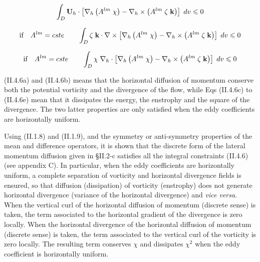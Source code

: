 \documentclass[../tex_main/NEMO_manual]{subfiles}
\begin{document}
\begin{equation} \label{eq:dynldf_curl}
\int_D {{\rm {\bf U}}_h \cdot \left[ {\nabla _h \left( {A^{lm}\;\chi } 
\right)-\nabla _h \times \left( {A^{lm}\;\zeta \;{\rm {\bf k}}} \right)} 
\right]\;dv} \leqslant 0
\end{equation}

\begin{equation} \label{eq:dynldf_curl2}
\mbox{if}\quad A^{lm}=cste\quad \quad \int_D {\zeta \;{\rm {\bf k}}\cdot 
\nabla \times \left[ {\nabla _h \left( {A^{lm}\;\chi } \right)-\nabla _h 
\times \left( {A^{lm}\;\zeta \;{\rm {\bf k}}} \right)} \right]\;dv} 
\leqslant 0
\end{equation}

\begin{equation} \label{eq:dynldf_div2}
\mbox{if}\quad A^{lm}=cste\quad \quad \int_D {\chi \;\nabla _h \cdot \left[ 
{\nabla _h \left( {A^{lm}\;\chi } \right)-\nabla _h \times \left( 
{A^{lm}\;\zeta \;{\rm {\bf k}}} \right)} \right]\;dv} \leqslant 0
\end{equation}


(II.4.6a) and (II.4.6b) means that the horizontal diffusion of momentum conserve both the potential vorticity and
the divergence of the flow, while Eqs (II.4.6c) to (II.4.6e) mean that it dissipates the energy, the enstrophy and
the square of the divergence.
The two latter properties are only satisfied when the eddy coefficients are horizontally uniform.

Using (II.1.8) and (II.1.9), and the symmetry or anti-symmetry properties of the mean and difference operators,
it is shown that the discrete form of the lateral momentum diffusion given in
{\S}II.2-c satisfies all the integral constraints (II.4.6) (see appendix C).
In particular, when the eddy coefficients are horizontally uniform,
a complete separation of vorticity and horizontal divergence fields is ensured,
so that diffusion (dissipation) of vorticity (enstrophy) does not generate horizontal divergence
(variance of the horizontal divergence) and \textit{vice versa}.
When the vertical curl of the horizontal diffusion of momentum (discrete sense) is taken,
the term associated to the horizontal gradient of the divergence is zero locally.
When the horizontal divergence of the horizontal diffusion of momentum (discrete sense) is taken,
the term associated to the vertical curl of the vorticity is zero locally.
The resulting term conserves $\chi$ and dissipates $\chi^2$ when the eddy coefficient is horizontally uniform.
\end{document}
